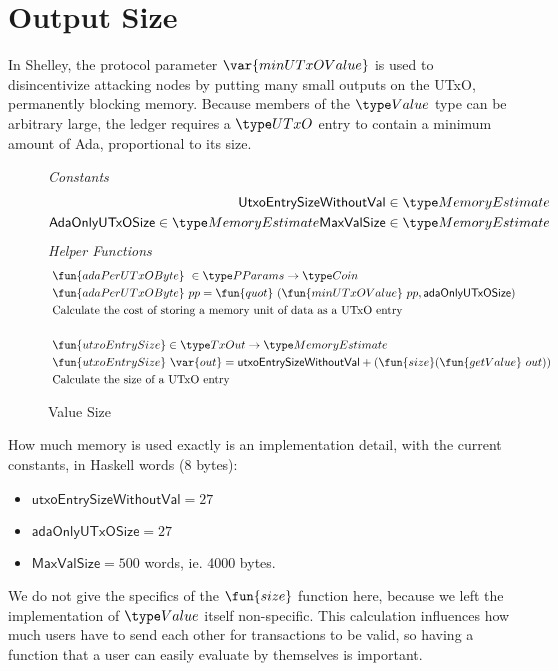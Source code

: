 \section{Output Size}
\label{sec:value-size}

In Shelley, the protocol parameter $\var{minUTxOValue}$ is used to
disincentivize attacking nodes by putting many small outputs on the
UTxO, permanently blocking memory. Because members of the $\Value$
type can be arbitrary large, the ledger requires a $\UTxO$ entry to
contain a minimum amount of Ada, proportional to its size.

\begin{figure*}[h]
  \emph{Constants}
  \begin{align*}
  \mathsf{UtxoEntrySizeWithoutVal} \in \MemoryEstimate \\
  \mathsf{AdaOnlyUTxOSize} \in \MemoryEstimate
  \mathsf{MaxValSize} \in \MemoryEstimate
  \end{align*}
  \emph{Helper Functions}
  \begin{align*}
    & \fun{adaPerUTxOByte}~\in \PParams \to \Coin \\
    & \fun{adaPerUTxOByte}~pp = \fun{quot}~ (\fun{minUTxOValue}~pp, \mathsf{adaOnlyUTxOSize}) \\
    & \text{Calculate the cost of storing a memory unit of data as a UTxO entry} \\~\\
    & \fun{utxoEntrySize} \in \TxOut \to \MemoryEstimate \\
    & \fun{utxoEntrySize}~\var{out} = \mathsf{utxoEntrySizeWithoutVal} + (\fun{size} (\fun{getValue}~out)) \\
    & \text{Calculate the size of a UTxO entry}
  \end{align*}
  \caption{Value Size}
  \label{fig:test}
\end{figure*}

How much memory is used exactly is an implementation detail, with the current constants, in Haskell words (8 bytes):
\begin{itemize}
  \item $\mathsf{utxoEntrySizeWithoutVal} = 27$
  \item $\mathsf{adaOnlyUTxOSize} = 27$
  \item $\mathsf{MaxValSize} = 500$ words, ie. 4000 bytes.
\end{itemize}

We do not give the specifics of the $\fun{size}$ function here, because
we left the implementation of $\Value$ itself non-specific. This calculation
influences how much users have to send each
other for transactions to be valid, so having a function that a user
can easily evaluate by themselves is important.

